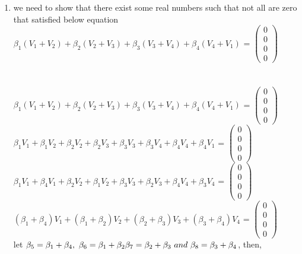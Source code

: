 \documentclass[45pt]{article}
\begin{document}
\begin{enumerate}
\item we need to show that there exist some real numbers such that not all are zero that satisfied below equation\\
$\beta_1 (V_1+V_2)+\beta_2 (V_2+V_3)+\beta_3 (V_3+V_4)+ \beta_4 (V_4+V_1)$ =
$\begin{pmatrix}
0\\0\\0\\0
\end{pmatrix}
$ \\\\

\\
$\beta_1 (V_1+V_2)+\beta_2 (V_2+V_3)+\beta_3 (V_3+V_4)+ \beta_4 (V_4+V_1)$ =
$\begin{pmatrix}
0\\0\\0\\0
\end{pmatrix}$\\
$\beta_1 V_1+\beta_1 V_2+\beta_2 V_2+ \beta_2 V_3+\beta_3 V_3+\beta_3 V_4+ \beta_4 V_4+ \beta_4 V_1$ =
$\begin{pmatrix}
0\\0\\0\\0
\end{pmatrix}$\\

$\beta_1 V_1+\beta_4 V_1+\beta_2 V_2+ \beta_1 V_2+\beta_3 V_3+\beta_2 V_3+ \beta_4 V_4+ \beta_3 V_4$ =
$\begin{pmatrix}
0\\0\\0\\0
\end{pmatrix}$\\

$(\beta_1+\beta_4)V_1+(\beta_1+\beta_2)V_2+(\beta_2+\beta_3)V_3 +(\beta_3+\beta_4)V_4$ =
$\begin{pmatrix}
0\\0\\0\\0
\end{pmatrix}$\\

let $\beta_5=\beta_1+\beta_4,~\beta_6=\beta_1+\beta_2\\
\beta_7=\beta_2+\beta_3~ and ~\beta_8=\beta_3+\beta_4$, then,\\


\end{enumerate}
\end{document}
